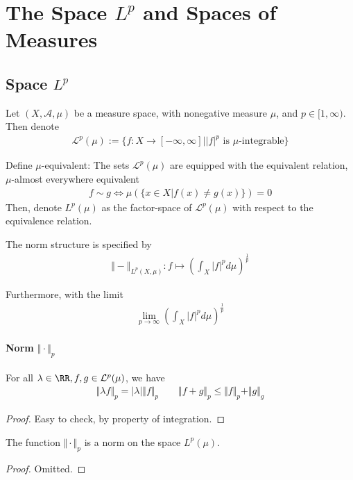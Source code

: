\documentclass[Total.tex]{subfiles}
\begin{document}
		\chapter{The Space $L^p$ and Spaces of Measures}
	\section{Space $L^p$}
	\begin{Def}
		Let $(X,\mathcal{A},\mu)$ be a measure space, with nonegative measure $\mu$, and $p\in [1,\infty)$. Then denote
		\begin{gather*}
			\mathcal{L}^p(\mu):=\{f:X\rightarrow [-\infty,\infty]||f|^p\mbox{ is }\mu\mbox{-integrable}\}
		\end{gather*}
		
		Define $\mu$-equivalent: The sets $\mathcal{L}^p(\mu)$ are equipped with the equivalent relation, $\mu$-almost everywhere equivalent
		\begin{gather*}
			f\sim g\Leftrightarrow \mu(\{x\in X|f(x)\not=g(x)\})=0
		\end{gather*}
		Then, denote $L^p(\mu)$ as the factor-space of $\mathcal{L}^p(\mu)$ with respect to the equivalence relation. 
		
		The norm structure is specified by
		\begin{gather*}
			\Vert-\Vert_{L^p(X,\mu)}:f\mapsto (\int_X |f|^p d\mu)^{\frac{1}{p}}
		\end{gather*} 
	\end{Def}
	
	Furthermore, with the limit
	\begin{gather*}
		\lim_{p\rightarrow\infty} (\int_X |f|^p d\mu)^\frac{1}{p}
	\end{gather*}
	\subsubsection{Norm $\Vert\cdot\Vert_p$}
	\begin{lemma}
		For all $\lambda\in \RR,f,g\in \mathcal{L}^p(\mu)$, we have
		\begin{gather*}
			\Vert\lambda f\Vert_p=|\lambda|\Vert f\Vert_p\qquad \Vert f+g\Vert_p\leq \Vert f\Vert_p+\Vert g\Vert_g
		\end{gather*}
	\end{lemma}
	\begin{proof}
		Easy to check, by property of integration. 
	\end{proof}
	
	\begin{corollary}
		The function $\Vert\cdot\Vert_p$ is a norm on the space $L^p(\mu)$. 
	\end{corollary}
	\begin{proof}
		Omitted. 
	\end{proof}
	
\end{document}
